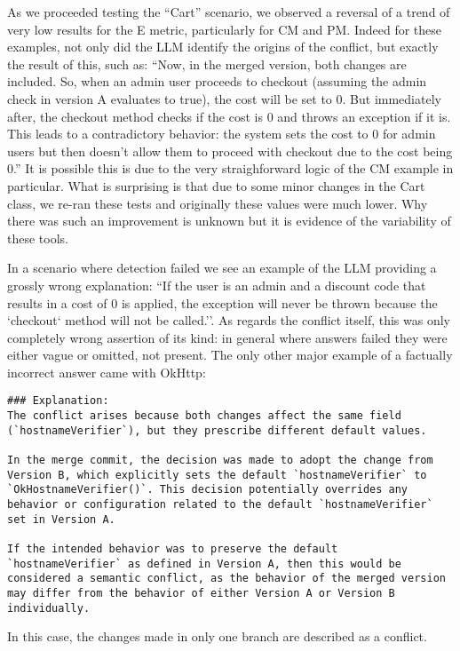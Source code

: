 As we proceeded testing the ``Cart'' scenario, we observed a reversal of a trend of very low results for the E metric, particularly for CM and PM.
Indeed for these examples, not only did the LLM identify the origins of the conflict, but exactly the result of this, such as:
``Now, in the merged version, both changes are included. So, when an admin user proceeds to checkout (assuming the admin check in version A evaluates to true), the cost will be set to 0. But immediately after, the checkout method checks if the cost is 0 and throws an exception if it is. This leads to a contradictory behavior: the system sets the cost to 0 for admin users but then doesn't allow them to proceed with checkout due to the cost being 0.''
It is possible this is due to the very straighforward logic of the CM example in particular. What is surprising is that due to some minor changes in the Cart class, we re-ran these tests and originally these values were much lower. Why there was such an improvement is unknown but it is evidence of the variability of these tools.

In a scenario where detection failed we see an example of the LLM providing a grossly wrong explanation: ``If the user is an admin and a discount code that results in a cost of 0 is applied, the exception will never be thrown because the `checkout` method will not be called.''. As regards the conflict itself, this was only completely wrong assertion of its kind: in general where answers failed they were either vague or omitted, not present. The only other major example of a factually incorrect answer came with OkHttp:
\begin{lstlisting}
### Explanation:
The conflict arises because both changes affect the same field (`hostnameVerifier`), but they prescribe different default values.
    
In the merge commit, the decision was made to adopt the change from Version B, which explicitly sets the default `hostnameVerifier` to `OkHostnameVerifier()`. This decision potentially overrides any behavior or configuration related to the default `hostnameVerifier` set in Version A.
    
If the intended behavior was to preserve the default `hostnameVerifier` as defined in Version A, then this would be considered a semantic conflict, as the behavior of the merged version may differ from the behavior of either Version A or Version B individually.
\end{lstlisting}
In this case, the changes made in only one branch are described as a conflict.

